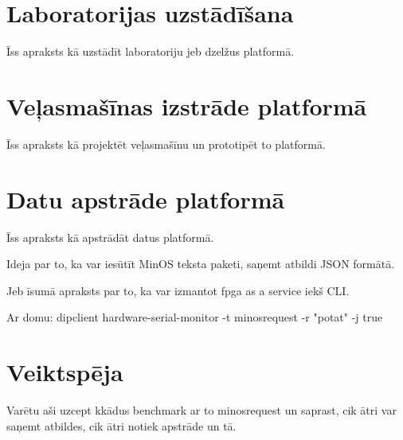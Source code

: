 \section{Laboratorijas uzstādīšana}

Īss apraksts kā uzstādīt laboratoriju jeb dzelžus platformā.

\section{Veļasmašīnas izstrāde platformā}

Īss apraksts kā projektēt veļasmašīnu un prototipēt to platformā.

\section{Datu apstrāde platformā}

Īss apraksts kā apstrādāt datus platformā.  

Ideja par to, ka var iesūtīt MinOS teksta paketi, saņemt atbildi JSON formātā.  

Jeb īsumā apraksts par to, ka var izmantot \gls{fpga} as a service iekš CLI.  

Ar domu: dipclient hardware-serial-monitor -t minosrequest -r "potat" -j true

\section{Veiktspēja}

Varētu aši uzcept kkādus benchmark ar to minosrequest un saprast, cik ātri var saņemt atbildes, cik ātri notiek apstrāde un tā.
